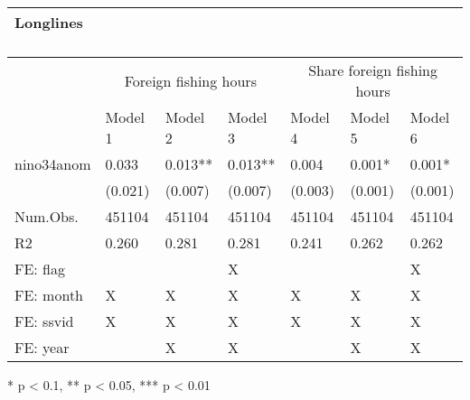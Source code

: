 \captionsetup[table]{labelformat=empty,skip=1pt}
\begin{longtable}{lllllll}
\caption*{
\large Longlines\\ 
\small \\ 
} \\ 
\toprule
& \multicolumn{3}{c}{Foreign fishing hours} & \multicolumn{3}{c}{Share foreign fishing hours} \\ 
 \cmidrule(lr){2-4}\cmidrule(lr){5-7}
  & Model 1 & Model 2 & Model 3 & Model 4 & Model 5 & Model 6 \\ 
\midrule
nino34anom & 0.033 & 0.013** & 0.013** & 0.004 & 0.001* & 0.001* \\ 
 & (0.021) & (0.007) & (0.007) & (0.003) & (0.001) & (0.001) \\ 
Num.Obs. & 451104 & 451104 & 451104 & 451104 & 451104 & 451104 \\ 
R2 & 0.260 & 0.281 & 0.281 & 0.241 & 0.262 & 0.262 \\ 
FE:  flag &  &  & X &  &  & X \\ 
FE:  month & X & X & X & X & X & X \\ 
FE:  ssvid & X & X & X & X & X & X \\ 
FE:  year &  & X & X &  & X & X \\ 
\bottomrule
\end{longtable}
\begin{minipage}{\linewidth}
* p < 0.1, ** p < 0.05, *** p < 0.01\\ 
\end{minipage}

